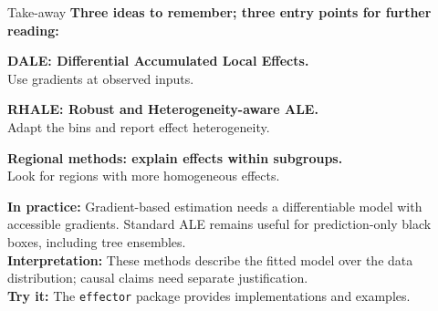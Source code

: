 \documentclass[10pt,compress,t,notes=noshow,xcolor=table]{beamer}
\begin{document}
\begin{framev}[align=top]{Take-away}
\textbf{Three ideas to remember; three entry points for further reading:}
\begin{itemizeM}
\item \textbf{DALE: Differential Accumulated Local Effects.}\\
Use gradients at observed inputs. 
\item \textbf{RHALE: Robust and Heterogeneity-aware ALE.}\\
Adapt the bins and report effect heterogeneity. 
\item \textbf{Regional methods: explain effects within subgroups.}\\
Look for regions with more homogeneous effects. 
\end{itemizeM}
\spacer[0.5]
\textbf{In practice:} Gradient-based estimation needs a differentiable model with accessible gradients.
Standard ALE remains useful for prediction-only black boxes, including tree ensembles.\\
\spacer[0.5]
\textbf{Interpretation:} These methods describe the fitted model over the data distribution; causal claims need separate justification.\\
\spacer[0.5]
\textbf{Try it:} The \texttt{effector} package provides implementations and examples. 
\end{framev}


\endlecture
\end{document}
